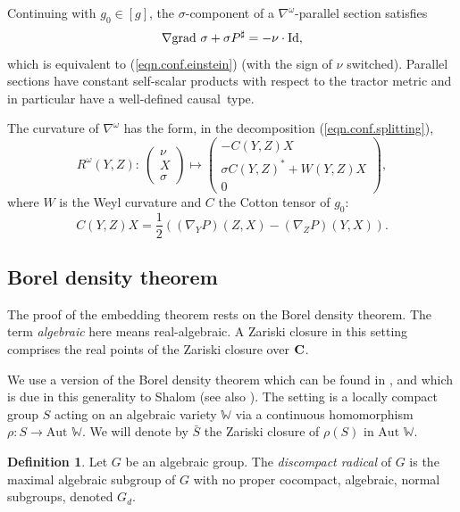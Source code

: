 \documentclass[10pt,a4paper]{amsart}
\numberwithin{equation}{section}
\theoremstyle{definition}
\newtheorem{defin}[thm]{Definition}
\begin{document}
Continuing with $g_0 \in [g]$, the $\sigma$-component of a $\nabla^\omega$-parallel section satisfies
\[ \nabla \mbox{grad } \sigma + \sigma P^\sharp = - \nu \cdot {\rm Id},\]
which is equivalent to (\ref{eqn.conf.einstein}) (with the sign of $\nu$ switched). Parallel sections have constant self-scalar products with respect to the tractor metric and in particular have a well-defined causal~type.

The curvature of $\nabla^\omega$ has the form, in the decomposition (\ref{eqn.conf.splitting}),
\begin{equation}
\label{eqn.conf.curv}
R^\omega(Y,Z) \colon\ \begin{pmatrix} \nu \\ X \\ \sigma \end{pmatrix} \mapsto \begin{pmatrix} - C(Y,Z)X \\ \sigma C(Y,Z)^* + W(Y,Z) X \\ 0 \end{pmatrix},
\end{equation}
where $W$ is the Weyl curvature and $C$ the Cotton tensor of $g_0$:
\[C(Y,Z)X = \frac{1}{2} \left( (\nabla_Y P)(Z,X) - (\nabla_Z P)(Y,X) \right).\]

\subsection{Borel density theorem}

The proof of the embedding theorem rests on the Borel density
theorem.
The term
\emph{algebraic} here means real-algebraic. A Zariski closure in this setting comprises the real points of the Zariski closure over ${\bf C}$.

 We use a version of the Borel density theorem which can be found in \cite[Corollary~3.2]{bfm.zimemb}, and which is due in this generality to Shalom
\cite[Theorem~3.11]{shalom.discompact} (see also \cite[Theorem~2.6]{dani.borel.density}).
The setting is a locally compact group $S$ acting on an algebraic variety $\mathbb{W}$ via a
continuous homomorphism $\rho \colon S \rightarrow \mbox{Aut } \mathbb{W}$. We
will denote by
$\bar{S}$ the Zariski closure of $\rho(S)$ in $\mbox{Aut }\mathbb{W}$.

\begin{defin}
 \label{def.discompact.rad}
 Let $G$ be an algebraic group.
The \emph{discompact radical} of $G$ is the maximal algebraic subgroup
of $G$ with no proper cocompact, algebraic, normal subgroups, denoted $G_d$.
 \end{defin}
\end{document}
